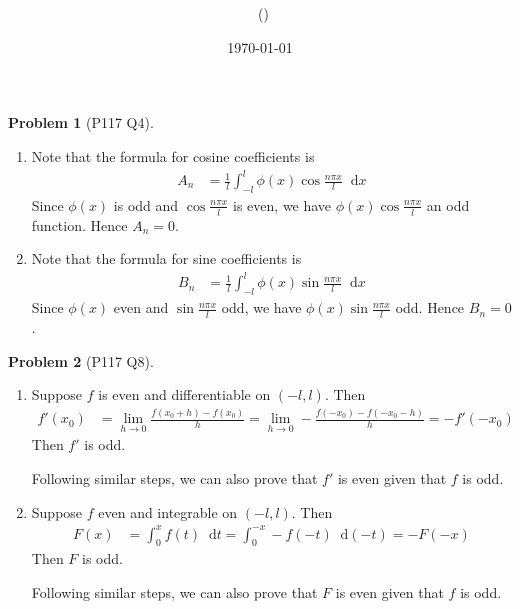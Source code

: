 \documentclass[twoside,11pt]{article}
\title{{\sffamily \Code \ \Ass}}
\author{\sffamily \name \ (\href{mailto:\mail}{\mail})}
\date{\sffamily \today}
\makeatletter
\renewcommand*\d{\mathop{}\!\mathrm{d}}
\theoremstyle{definition}
\newtheorem{problem}{Problem}
\theoremstyle{remark}
\newtheorem*{remark}{Remark}
\renewcommand{\maketitle}{\bgroup\setlength{\parindent}{0pt}
\begin{flushleft}
  \textbf{\Large\@title}

  \@author
\end{flushleft}\egroup
}
\makeatother
\begin{document}
\maketitle
\thispagestyle{title}



\begin{problem}[P117 Q4]\
\begin{enumerate}[label=(\alph*)]
\item Note that the formula for cosine coefficients is
\begin{align*}
    A_n &= \frac{1}{l}\int_{-l}^l \phi(x)\cos\frac{n\pi x}{l}\d x
\end{align*}
Since $\phi(x)$ is odd and $\cos\frac{n\pi x}{l}$ is even, we have
$\phi(x)\cos\frac{n\pi x}{l}$ an odd function.
Hence $A_n=0$.

\item Note that the formula for sine coefficients is
\begin{align*}
    B_n &= \frac{1}{l}\int_{-l}^l \phi(x)\sin\frac{n\pi x}{l}\d x
\end{align*}
Since $\phi(x)$ even and $\sin\frac{n\pi x}{l}$ odd, we have
$\phi(x)\sin\frac{n\pi x}{l}$ odd.
Hence $B_n=0$.

\end{enumerate}
\end{problem}


\begin{problem}[P117 Q8]\
\begin{enumerate}[label=(\alph*)]
\item Suppose $f$ is even and differentiable on $(-l, l)$.
Then 
\begin{align*}
    f'(x_0) &= 
    \lim_{h\rightarrow 0}\frac{f(x_0+h) - f(x_0)}{h}
    = \lim_{h\rightarrow 0}-\frac{f(-x_0) - f(-x_0 - h)}{h}
    = -f'(-x_0)
\end{align*}
Then $f'$ is odd.

Following similar steps, we can also prove that $f'$ is even given that $f$ is odd.

\item Suppose $f$ even and integrable on $(-l, l)$.
Then
\begin{align*}
    F(x) &= \int_0^x f(t)\d t
    = \int_0^{-x} -f(-t)\d (-t)
    = -F(-x)
\end{align*}
Then $F$ is odd.

Following similar steps, we can also prove that $F$ is even given that $f$ is odd.

\end{enumerate}
\end{problem}
\end{document}
